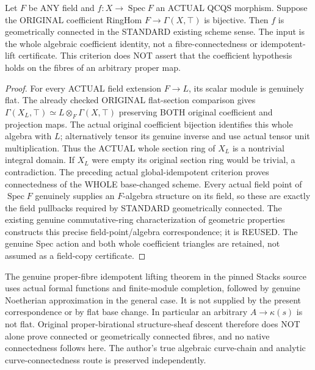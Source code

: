 \begin{theorem}
\label{scheme:actual-field-global-sections-geometric-connectedness}
\leanok
{}
Let $F$ be ANY field and $f:X\to\operatorname{Spec}F$ an ACTUAL QCQS
morphism. Suppose the ORIGINAL coefficient RingHom
$F\to\Gamma(X,\top)$ is bijective. Then $f$ is geometrically connected
in the STANDARD existing scheme sense. The input is the whole algebraic
coefficient identity, not a fibre-connectedness or idempotent-lift
certificate. This criterion does NOT assert that the coefficient hypothesis
holds on the fibres of an arbitrary proper map.
\end{theorem}
\begin{proof}
For every ACTUAL field extension $F\to L$, its scalar module is genuinely
flat. The already checked ORIGINAL flat-section comparison gives
$\Gamma(X_L,\top)\simeq L\otimes_F\Gamma(X,\top)$ preserving BOTH
original coefficient and projection maps. The actual original coefficient
bijection identifies this whole algebra with $L$; alternatively tensor its
genuine inverse and use actual tensor unit multiplication. Thus the ACTUAL
whole section ring of $X_L$ is a nontrivial integral domain. If $X_L$ were
empty its original section ring would be trivial, a contradiction. The
preceding actual global-idempotent criterion proves connectedness of the
WHOLE base-changed scheme. Every actual field point of $\operatorname{Spec}F$
genuinely supplies an $F$-algebra structure on its field, so these are
exactly the field pullbacks required by STANDARD geometrically connected.
The existing genuine commutative-ring characterization of geometric
properties constructs this precise field-point/algebra correspondence;
it is REUSED. The genuine Spec action and both whole coefficient triangles
are retained, not assumed as a field-copy certificate.
\end{proof}

\begin{remark}
The genuine proper-fibre idempotent lifting theorem in the pinned Stacks
source uses actual formal functions and finite-module completion, followed
by genuine Noetherian approximation in the general case. It is not supplied
by the present correspondence or by flat base change. In particular an
arbitrary $A\to\kappa(s)$ is not flat. Original proper-birational
structure-sheaf descent therefore does NOT alone prove connected or
geometrically connected fibres, and no native connectedness follows here.
The author's true algebraic curve-chain and analytic curve-connectedness
route is preserved independently.
\end{remark}
